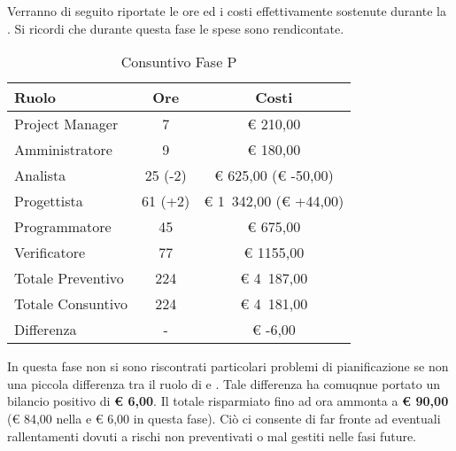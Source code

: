	Verranno di seguito riportate le ore ed i costi effettivamente sostenute durante la . Si ricordi che durante questa fase le spese sono rendicontate.
	\begin{table}[H]
		\begin{center}
			\begin{tabular}{| l | c | c |}
				\hline
				Ruolo 				& Ore 	& Costi  \\ \hline
				
				Project Manager		& 7 		& \euro{} 210,00 	\\
				Amministratore 		& 9 		& \euro{} 180,00 	\\
				Analista	 		& 25 (-2) 		& \euro{} 625,00 (\euro{} -50,00)	\\
				Progettista 		& 61 (+2)		& \euro{} 1~342,00 (\euro{} +44,00) 	\\
				Programmatore		& 45 		& \euro{} 675,00 	\\
				Verificatore		& 77 		& \euro{} 1155,00 	\\ \hline \hline
				
				Totale Preventivo	& 224 			& \euro{} 4~187,00 	\\ \hline
				Totale Consuntivo	& 224 			& \euro{} 4~181,00 	\\ \hline
				Differenza			& - 			& \euro{} -6,00 	\\ \hline
			\end{tabular}
		\end{center}
		\caption{Consuntivo Fase P}
	\end{table}
			In questa fase non si sono riscontrati particolari problemi di pianificazione se non una piccola differenza tra il ruolo di  e . Tale differenza ha comuqnue portato un bilancio positivo di \textbf{\euro{} 6,00}.
			Il totale risparmiato fino ad ora ammonta a \textbf{\euro{} 90,00} (\euro{} 84,00 nella  e \euro{} 6,00 in questa fase). Ciò ci consente di far fronte ad eventuali rallentamenti dovuti a rischi non preventivati o mal gestiti nelle fasi future.
	

						
